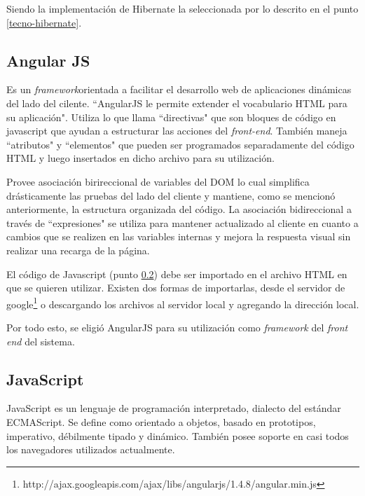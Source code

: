         Siendo la implementación de Hibernate la seleccionada por lo descrito en el punto \ref{tecno-hibernate}.
        
        \subsection{Angular JS}
        \label{tecno-angular}
        
        Es un \textit{framework}orientada a facilitar el desarrollo web de aplicaciones dinámicas del lado del cilente. ``AngularJS le permite extender el vocabulario HTML para su aplicación"\cite{ANGULARJS-angularjs}. Utiliza lo que llama ``directivas" que son bloques de código en javascript que ayudan a estructurar las acciones del \textit{front-end}. También maneja ``atributos" y ``elementos" que pueden ser programados separadamente del código HTML y luego insertados en dicho archivo para su utilización.
        
        Provee asociación birireccional de variables del DOM lo cual simplifica drásticamente las pruebas del lado del cliente y mantiene, como se mencionó anteriormente, la estructura organizada del código. La asociación bidireccional a través de ``expresiones" se utiliza para mantener actualizado al cliente en cuanto a cambios que se realizen en las variables internas y mejora la respuesta visual sin realizar una recarga de la página.
        
        El código de Javascript (punto \ref{tecno-javascript}) debe ser importado en el archivo HTML en que se quieren utilizar. Existen dos formas de importarlas, desde el servidor de google\footnote{http://ajax.googleapis.com/ajax/libs/angularjs/1.4.8/angular.min.js} o descargando los archivos al servidor local y agregando la dirección local.
        
        Por todo esto, se eligió AngularJS para su utilización como \textit{framework} del \textit{front end} del sistema.
        
        \subsection{JavaScript}
        \label{tecno-javascript}
        
        JavaScript es un lenguaje de programación interpretado, dialecto del estándar ECMAScript. Se define como orientado a objetos, basado en prototipos, imperativo, débilmente tipado y dinámico\cites{JAVASCRIPT-wiki}{JAVASCRIPT-manual}. También posee soporte en casi todos los navegadores utilizados actualmente.
        
